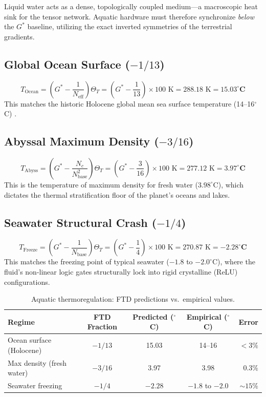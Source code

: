 \documentclass[11pt, letterpaper]{article}
\newcommand{\G}{G^*}
\theoremstyle{definition}
\theoremstyle{remark}
\begin{document}
Liquid water acts as a dense, topologically coupled medium---a macroscopic heat sink for the tensor network. Aquatic hardware must therefore synchronize \textit{below} the $\G$ baseline, utilizing the exact inverted symmetries of the terrestrial gradients.

\subsection{Global Ocean Surface ($-1/13$)}
\begin{equation}
    T_{\text{Ocean}} = \left(\G - \frac{1}{N_{\text{eff}}}\right)\Theta_T = \left(\G - \frac{1}{13}\right) \times 100 \text{ K} = 288.18 \text{ K} = \mathbf{15.03^\circ\text{C}}
\end{equation}
This matches the historic Holocene global mean sea surface temperature (14--16$^\circ$C) \cite{Hansen2013}.

\subsection{Abyssal Maximum Density ($-3/16$)}
\begin{equation}
    T_{\text{Abyss}} = \left(\G - \frac{N_c}{N_{\text{base}}^2}\right)\Theta_T = \left(\G - \frac{3}{16}\right) \times 100 \text{ K} = 277.12 \text{ K} = \mathbf{3.97^\circ\text{C}}
\end{equation}
This is the temperature of maximum density for fresh water ($3.98^\circ$C), which dictates the thermal stratification floor of the planet's oceans and lakes.

\subsection{Seawater Structural Crash ($-1/4$)}
\begin{equation}
    T_{\text{Freeze}} = \left(\G - \frac{1}{N_{\text{base}}}\right)\Theta_T = \left(\G - \frac{1}{4}\right) \times 100 \text{ K} = 270.87 \text{ K} = \mathbf{-2.28^\circ\text{C}}
\end{equation}
This matches the freezing point of typical seawater ($-1.8$ to $-2.0^\circ$C), where the fluid's non-linear logic gates structurally lock into rigid crystalline (ReLU) configurations.

\begin{table}[hbt!]
\centering
\caption{Aquatic thermoregulation: FTD predictions vs.\ empirical values.}
\label{tab:aquatic}
\begin{tabular}{@{}lcccr@{}}
\toprule
\textbf{Regime} & \textbf{FTD Fraction} & \textbf{Predicted ($^\circ$C)} & \textbf{Empirical ($^\circ$C)} & \textbf{Error} \\
\midrule
Ocean surface (Holocene) & $-1/13$ & 15.03 & 14--16 & $<3\%$ \\
Max density (fresh water) & $-3/16$ & 3.97 & 3.98 & $0.3\%$ \\
Seawater freezing & $-1/4$ & $-2.28$ & $-1.8$ to $-2.0$ & $\sim 15\%$ \\
\bottomrule
\end{tabular}
\end{table}
\end{document}
